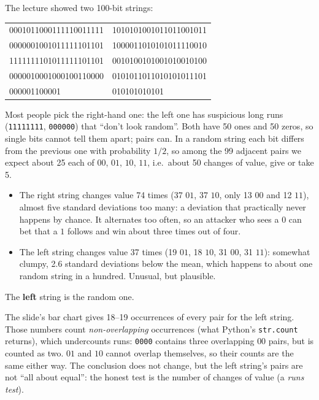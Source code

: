 \begin{example}
\label{ex:which-random}
The lecture showed two 100-bit strings:
\begin{center}
\small\ttfamily
\begin{tabular}{@{}l@{\qquad}l@{}}
0001011000111110011111 & 1010101001011011001011 \\
0000001001011111101101 & 1000011010101011110010 \\
1111111101011111101101 & 0010100101001010010100 \\
0000010001000100110000 & 0101011011010101011101 \\
000001100001           & 010101010101
\end{tabular}
\end{center}
Most people pick the right-hand one: the left one has suspicious long runs (\texttt{11111111}, \texttt{000000}) that \enquote{don't look random}. Both have 50 ones and 50 zeros, so single bits cannot tell them apart; pairs can. In a random string each bit differs from the previous one with probability $1/2$, so among the 99 adjacent pairs we expect about 25 each of $00$, $01$, $10$, $11$, i.e.\ about 50 changes of value, give or take 5.
\begin{itemize}
    \item The right string changes value 74 times (37 $01$, 37 $10$, only 13 $00$ and 12 $11$), almost five standard deviations too many: a deviation that practically never happens by chance. It alternates too often, so an attacker who sees a $0$ can bet that a $1$ follows and win about three times out of four.
    \item The left string changes value 37 times (19 $01$, 18 $10$, 31 $00$, 31 $11$): somewhat clumpy, 2.6 standard deviations below the mean, which happens to about one random string in a hundred. Unusual, but plausible.
\end{itemize}
The \textbf{left} string is the random one.
\end{example}

\begin{remark}
The slide's bar chart gives 18--19 occurrences of every pair for the left string. Those numbers count \emph{non-overlapping} occurrences (what Python's \texttt{str.count} returns), which undercounts runs: \texttt{0000} contains three overlapping $00$ pairs, but is counted as two. $01$ and $10$ cannot overlap themselves, so their counts are the same either way. The conclusion does not change, but the left string's pairs are not \enquote{all about equal}: the honest test is the number of changes of value (a \emph{runs test}).
\end{remark}

